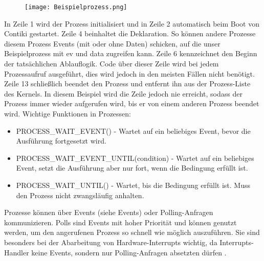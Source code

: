 \begin{figure}[h!]
	\centering
		\texttt{[image: Beispielprozess.png]}
	\label{Beispielprozess}
\end{figure}
In Zeile 1 wird der Prozess initialisiert und in Zeile 2 automatisch beim Boot von Contiki gestartet. Zeile 4 beinhaltet die
Deklaration. So k\"onnen andere Prozesse diesem Prozess Events (mit oder ohne Daten) schicken, auf die unser Beispielprozess 
mit ev und data zugreifen kann. Zeile 6 kennzeichnet den Beginn der tats\"achlichen Ablauflogik. Code \"uber dieser Zeile wird 
bei jedem Prozessaufruf ausgef\"uhrt, dies wird jedoch in den meisten F\"allen nicht ben\"otigt. Zeile 13 schlie{\ss}lich beendet
den Prozess und entfernt ihn aus der Prozess-Liste des Kernels. In diesem Beispiel wird die Zeile jedoch nie erreicht, sodass der Prozess immer wieder aufgerufen wird, bis er von einem anderen Prozess beendet wird.
Wichtige Funktionen in Prozessen:
\begin{itemize}
\item PROCESS\_WAIT\_EVENT() - Wartet auf ein beliebiges Event, bevor die Ausf\"{u}hrung fortgesetzt wird.
\item PROCESS\_WAIT\_EVENT\_UNTIL(condition) - Wartet auf ein beliebiges Event, setzt die Ausf\"{u}hrung aber nur fort, wenn die Bedingung erf\"{u}llt ist.
\item PROCESS\_WAIT\_UNTIL() - Wartet, bis die Bedingung erf\"ullt ist. Muss den Prozess nicht zwangsl\"{a}ufig anhalten.
\end{itemize}
Prozesse k\"onnen \"uber Events (siehe Events) oder Polling-Anfragen kommunizieren.  Polls sind Events mit hoher Priorit\"at und 
k\"onnen genutzt werden, um den angerufenen Prozess so schnell wie m\"oglich auszuf\"uhren. Sie
sind besonders bei der Abarbeitung von Hardware-Interrupts wichtig, da Interrupts-Handler keine Events, sondern nur
Polling-Anfragen absetzten d\"urfen \cite[vgl.][S. 7]{Walter:2010}.




